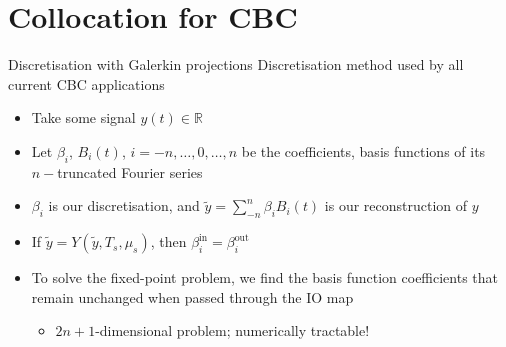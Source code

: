 \documentclass[presentation]{beamer}
\begin{document}
\section{Collocation for CBC}
\label{sec:org9cf54cc}
\begin{frame}[label={sec:org6153527}]{Discretisation with Galerkin projections}
Discretisation method used by all current CBC applications
\vfill
\begin{itemize}
\item Take some signal \(y(t)\in\mathbb{R}\)
\end{itemize}
\vfill
\begin{itemize}
\item Let \(\beta_i\), \(B_i(t)\), \(i=-n,\dots,0,\dots,n\) be the coefficients, basis functions of its \(n-\)truncated Fourier series
\end{itemize}
\vfill
\begin{itemize}
\item \(\beta_i\) is our discretisation, and \(\tilde{y} = \sum_{-n}^n \beta_iB_i(t)\) is our reconstruction of \(y\)
\end{itemize}
\vfill
\begin{itemize}
\item If \(\tilde{y} = Y(\tilde{y}, T_s, \mu_s)\), then \(\beta_i^\text{in} = \beta_i^\text{out}\)
\end{itemize}
\vfill
\begin{itemize}
\item To solve the fixed-point problem, we find the basis function coefficients that remain unchanged when passed through the IO map
\begin{itemize}
\item \(2n+1\)-dimensional problem; numerically tractable!
\end{itemize}
\end{itemize}
\end{frame}
\end{document}
